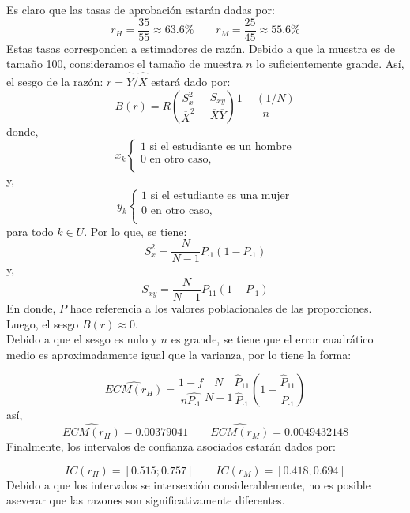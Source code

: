\noaddpoints
{}
\begin{solution}
Es claro que las tasas de aprobación estarán dadas por:
$$r_H=\dfrac{35}{55}\approx 63.6\% \quad \quad r_M=\dfrac{25}{45}\approx 55.6\%$$
Estas tasas corresponden a estimadores de razón. Debido a que la muestra es de tamaño 100, consideramos el tamaño de muestra $n$ lo suficientemente grande. Así, el sesgo de la razón: $r=\widehat{\overline{Y}}/\widehat{\overline{X}}$ estará dado por:
$$B(r)=R\left(\dfrac{S_{x}^2}{\overline{X}^2}-\dfrac{S_{xy}}{\overline{X}\overline{Y}} \right)\dfrac{1-(1/N)}{n}$$
donde,
$$x_k \begin{cases} 
1 \text{ si el estudiante es un hombre}\\
0 \text{ en otro caso,}\\
\end{cases}
$$
y,
$$y_k \begin{cases} 
1 \text{ si el estudiante es una mujer}\\
0 \text{ en otro caso,}\\
\end{cases}
$$
para todo $k\in U$. Por lo que, se tiene:
$$S_{x}^{2}=\dfrac{N}{N-1}P_{\cdot 1} (1-P_{\cdot 1})$$
y,
$$S_{xy}=\dfrac{N}{N-1}P_{11} (1-P_{\cdot 1})$$
En donde, $P$ hace referencia a los valores poblacionales de las proporciones. Luego, el sesgo $B(r)\approx 0$.\\

Debido a que el sesgo es nulo y $n$ es grande, se tiene que el error cuadrático medio es aproximadamente igual que la varianza, por lo tiene la forma:

$$\widehat{ECM(r_H)}=\dfrac{1-f}{n\hat{P_{\cdot 1}}}\dfrac{N}{N-1} \dfrac{\hat{P}_{11}}{\hat{P}_{\cdot 1}}\left(1- \dfrac{\hat{P}_{11}}{\hat{P}_{\cdot 1}}\right)$$
así,
$$\widehat{ECM(r_H)}=0.00379041 \quad \quad \widehat{ECM(r_M)}=0.0049432148$$
Finalmente, los intervalos de confianza asociados estarán dados por:

$$IC(r_H)=\left[ 0.515;0.757\right] \quad \quad IC(r_M)=\left[ 0.418;0.694\right]$$
Debido a que los intervalos se intersección considerablemente, no es posible aseverar que las razones son significativamente diferentes.
\end{solution}